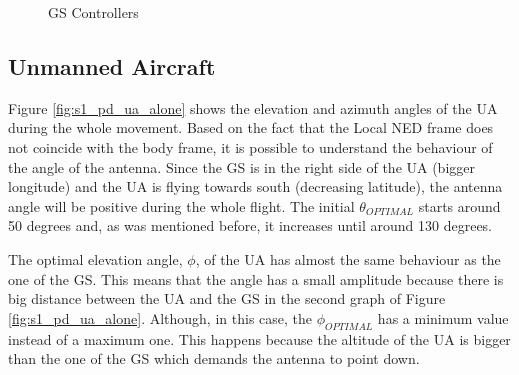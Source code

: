 \begin{figure}[H]
	\hfill
	\hfill
	\caption{GS Controllers}
	\label{fig:s1_gs}
\end{figure}

\subsection{Unmanned Aircraft}
Figure \ref{fig:s1_pd_ua_alone} shows the elevation and azimuth angles of the UA during the whole movement. Based on the fact that the Local NED frame does not coincide with the body frame, it is possible to understand the behaviour of the angle of the antenna. Since the GS is in the right side of the UA (bigger longitude) and the UA is flying towards south (decreasing latitude), the antenna angle will be positive during the whole flight.
The initial $\theta_{OPTIMAL}$ starts around 50 degrees and, as was mentioned before, it increases until around 130 degrees.

The optimal elevation angle, $\phi$, of the UA has almost the same behaviour as the one of the GS. This means that the angle has a small amplitude because there is big distance between the UA and the GS in the second graph of Figure \ref{fig:s1_pd_ua_alone}. Although, in this case, the $\phi_{OPTIMAL}$ has a minimum value instead of a maximum one. This happens because the altitude of the UA is bigger than the one of the GS which demands the antenna to point down.


